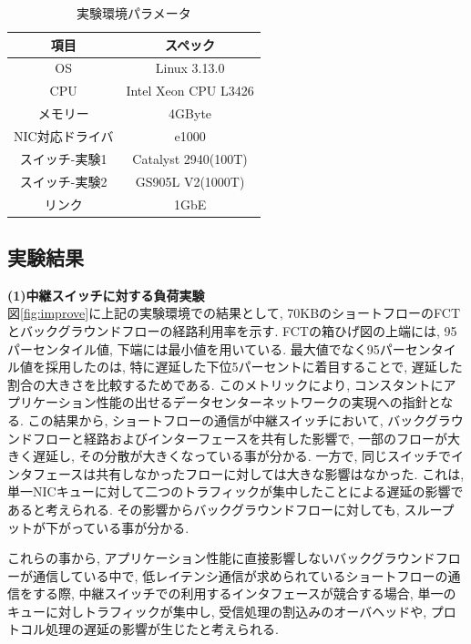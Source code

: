 \begin{table}[t]
\begin{center}
\footnotesize
\begin{tabular}{c|c}
\hline
項目 & スペック \\ \hline \hline
OS & Linux 3.13.0 \\
CPU & Intel Xeon CPU L3426 \\
メモリー & 4GByte \\
NIC対応ドライバ & e1000 \\
スイッチ-実験1 & Catalyst 2940(100T) \\
スイッチ-実験2 & GS905L V2(1000T) \\
リンク & 1GbE \\
\hline
\end{tabular}
\caption{実験環境パラメータ}
\label{table:experiment_ver}
\end{center}
\end{table}

\subsection{実験結果}
{\bf (1)中継スイッチに対する負荷実験}\\
図\ref{fig:improve}に上記の実験環境での結果として, 70KBのショートフローのFCTとバックグラウンドフローの経路利用率を示す.
FCTの箱ひげ図の上端には, 95パーセンタイル値, 下端には最小値を用いている.
最大値でなく95パーセンタイル値を採用したのは, 特に遅延した下位5パーセントに着目することで, 遅延した割合の大きさを比較するためである.
このメトリックにより, コンスタントにアプリケーション性能の出せるデータセンターネットワークの実現への指針となる.
この結果から, ショートフローの通信が中継スイッチにおいて, バックグラウンドフローと経路およびインターフェースを共有した影響で,
一部のフローが大きく遅延し, その分散が大きくなっている事が分かる.
一方で, 同じスイッチでインタフェースは共有しなかったフローに対しては大きな影響はなかった.
これは, 単一NICキューに対して二つのトラフィックが集中したことによる遅延の影響であると考えられる.
その影響からバックグラウンドフローに対しても, スループットが下がっている事が分かる.

これらの事から, アプリケーション性能に直接影響しないバックグラウンドフローが通信している中で,
低レイテンシ通信が求められているショートフローの通信をする際, 中継スイッチでの利用するインタフェースが競合する場合,
単一のキューに対しトラフィックが集中し, 受信処理の割込みのオーバヘッドや, プロトコル処理の遅延の影響が生じたと考えられる.

